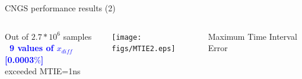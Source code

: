 \documentclass[compress,red]{beamer}
\begin{document}
\begin{frame}{CNGS performance results (2)}

  \begin{columns}[c]
	\begin{center}

	    Out of $2.7*10^6$ samples\\
			\textbf{\textcolor{blue}{~9 values of $x_{diff}$ [0.0003$\%$]}} \\
                       exceeded MTIE=1ns
		
% 
	\end{center}
		\vspace{0.08cm}
		\begin{center}
		\texttt{[image: figs/MTIE2.eps]}
		\end{center}
		\begin{center}
		Maximum Time Interval Error
		\end{center}
  \end{columns}
  \begin{columns}[c]

  \end{columns}
\end{frame}
\end{document}
